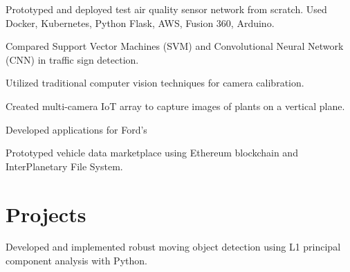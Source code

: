 \documentclass[]{deedy-resume-openfont}
\begin{document}
\begin{minipage}[t]{0.70\textwidth}
\begin{tightemize}%

\item Prototyped and deployed test air quality sensor network from scratch. Used Docker, Kubernetes, Python Flask, AWS, Fusion 360, Arduino.
\item Compared Support Vector Machines (SVM) and Convolutional Neural Network (CNN) in traffic sign detection.


\end{tightemize}
\sectionsep

\begin{tightemize}
\item Utilized traditional computer vision techniques for camera calibration.
\item Created multi-camera IoT array to capture images of plants on a vertical plane.
\end{tightemize}
\sectionsep

\begin{tightemize}%

\item Developed applications for Ford's 
\item Prototyped vehicle data marketplace using Ethereum blockchain and InterPlanetary File System.

\end{tightemize}
\sectionsep



\section{Projects}
\begin{tightemize}
\item Developed and implemented robust moving object detection using L1 principal component analysis with Python.
\end{tightemize}
\sectionsep


\end{minipage}
\end{document}
